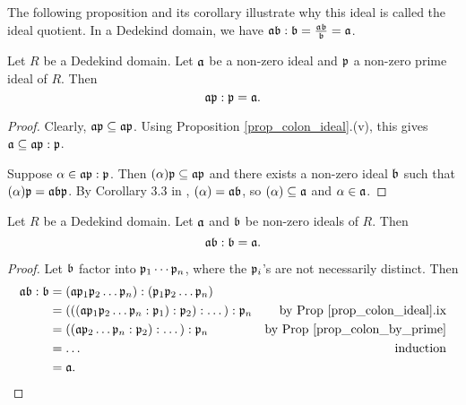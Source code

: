 The following proposition and its corollary illustrate why this ideal is called the ideal quotient.
In a Dedekind domain, we have $\frak a \frak b : \frak b = \frac {\frak a \frak b}{\frak b} = \frak a$.

\begin{proposition}
  \label{prop_colon_by_prime}
  Let $R$ be a Dedekind domain.
  Let $\frak a$ be a non-zero ideal and $\frak p$ a non-zero prime ideal of $R$. Then
  \[ \frak a \frak p : \frak p = \frak a. \]
\end{proposition}
\begin{proof}
  Clearly, $\frak a \frak p \subseteq \frak a \frak p$.
  Using Proposition \ref{prop_colon_ideal}.(v),
  this gives $\frak a \subseteq \frak a \frak p : \frak p$.
  
  Suppose $\alpha \in \frak a \frak p : \frak p$.
  Then $(\alpha)\frak p \subseteq \frak a \frak p$
  and there exists a non-zero ideal $\frak b$ such that $(\alpha)\frak p = \frak a \frak b \frak p$.
  By Corollary 3.3 in \cite{conrad}, $(\alpha) = \frak a \frak b$,
  so $(\alpha) \subseteq \frak a$ and $\alpha \in \frak a$.
\end{proof}

\begin{corollary}
  \label{cor_ab_colon_b_is_a}
  Let $R$ be a Dedekind domain.
  Let $\frak a$ and $\frak b$ be non-zero ideals of $R$. Then
  \[ \frak a \frak b : \frak b = \frak a. \]
\end{corollary}
\begin{proof}
  Let $\frak b$ factor into $\frak p_1 \cdots \frak p_n$, where the $\frak p_i$'s are not necessarily distinct.
  Then
  \begin{align*}
    \frak a \frak b : \frak b
      &= (\frak a \frak p_1 \frak p_2 \dots \frak p_n) : (\frak p_1 \frak p_2 \dots \frak p_n) \\
      &= (((\frak a \frak p_1 \frak p_2 \dots \frak p_n : \frak p_1) : \frak p_2) : \dots) : \frak p_n
        & \text{by Prop \ref{prop_colon_ideal}.ix} \\
      &= ((\frak a \frak p_2 \dots \frak p_n : \frak p_2) : \dots) : \frak p_n
        & \text{by Prop \ref{prop_colon_by_prime}} \\
      &= \dots & \text{induction} \\
      &= \frak a.
  \end{align*}
\end{proof}


